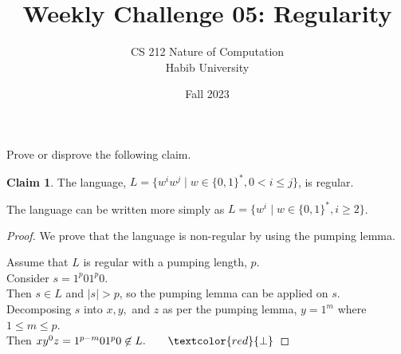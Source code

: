 \documentclass[a4paper]{exam}
\title{Weekly Challenge 05: Regularity}
\author{CS 212 Nature of Computation\\Habib University}
\date{Fall 2023}
\theoremstyle{definition}
\theoremstyle{claim}
\newtheorem{claim}{Claim}
\begin{document}
\maketitle

\begin{questions}


  Prove or disprove the following claim.
  \begin{claim}
    The language, $L = \{ w^iw^j \mid w\in\{0,1\}^*, 0 < i \le j \}$, is regular.
  \end{claim}

  \begin{solution}
    The language can be written more simply as $L = \{ w^i \mid w\in\{0,1\}^*, i \ge 2 \}$.
    \begin{proof} We prove that the language is non-regular by using the pumping lemma.

      Assume that $L$ is regular with a pumping length, $p$.\\
      Consider $s = 1^p01^p0$.\\
      Then $s\in L$ and $|s| > p$, so the pumping lemma can be applied on $s$.\\
      Decomposing $s$ into $x, y,$ and $z$ as per the pumping lemma, $y=1^m$ where $1\le m \le p$.\\
      Then $xy^0z = 1^{p-m}01^p0 \not\in L.\qquad \textcolor{red}{\bot}$
    \end{proof}
  \end{solution}
  
\end{questions}
\end{document}
